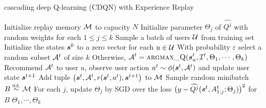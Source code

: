 \documentclass{article} %
\begin{document}
\begin{algorithm}[ht!]
\caption{cascading deep Q-learning (CDQN) with Experience Replay}
\label{alg:dqn}
\begin{algorithmic}[1]
\State Initialize replay memory ${\mathcal{M}}$ to capacity $N$ 
\State Initialize parameter $\Theta_j$ of $\widehat{Q^j}$ with random weights for each $1\leq j\leq k$
	\State Sample a batch of users ${\mathcal{U}}$ from training set
	\State Initialize the states ${{\bm{s}}}^0$ to a zero vector for each $u\in {\mathcal{U}}$
	        \State With probability $\varepsilon$ select a random subset ${\mathcal{A}}^t$ of size $k$\label{line:epsilon-greedy}
		    \State Otherwise, $\displaystyle {\mathcal{A}}^t =
	\textsc{argmax\_Q}({\bm{s}}_u^t, {\mathcal{I}}^t, \Theta_1,\cdots,\Theta_k)$\label{line:argmax}
 		    \State Recommend ${\mathcal{A}}^t$ to user $u$, observe user action $a^t\sim\phi({\bm{s}}^t,{\mathcal{A}}^t)$ and update user state ${\bm{s}}^{t+1}$
		    \State Add tuple $\big({\bm{s}}^t, {\mathcal{A}}^t, r({\bm{s}}^t, a^t), {\bm{s}}^{t+1}\big)$ to ${\mathcal{M}}$\label{line:exp_replay1}
		\EndFor
		\State Sample random minibatch $B\overset{\text{iid.}}{\sim}{\mathcal{M}}$\label{line:exp_replay2}
		\State For each $j$, update $\Theta_j$ by SGD over the loss $\big(y- \widehat{Q^j}({\bm{s}}^t, A^t_{1:j}; \Theta_j)\big)^2$ for $B$\label{line:exp_replay3}
	\EndFor
\EndFor
\State \Return $\Theta_1,\cdots,\Theta_k$
\end{algorithmic}
\end{algorithm}
\end{document}
